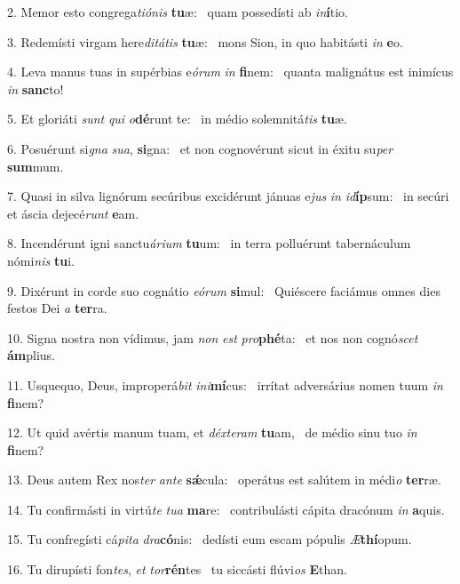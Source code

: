 2. Memor esto congrega\textit{ti}\textit{ó}\textit{nis} \textbf{tu}æ: \ast\  quam possedísti ab \textit{in}\textbf{í}tio.\

3. Redemísti virgam here\textit{di}\textit{tá}\textit{tis} \textbf{tu}æ: \ast\  mons Sion, in quo habitásti \textit{in} \textbf{e}o.\

4. Leva manus tuas in supérbias e\textit{ó}\textit{rum} \textit{in} \textbf{fi}nem: \ast\  quanta malignátus est inimícus \textit{in} \textbf{sanc}to!\

5. Et gloriáti \textit{sunt} \textit{qui} \textit{o}\textbf{dé}runt te: \ast\  in médio solemnitá\textit{tis} \textbf{tu}æ.\

6. Posuérunt si\textit{gna} \textit{su}\textit{a}, \textbf{si}gna: \ast\  et non cognovérunt sicut in éxitu su\textit{per} \textbf{sum}mum.\

7. Quasi in silva lignórum secúribus excidérunt jánuas e\textit{jus} \textit{in} \textit{id}\textbf{íp}sum: \ast\  in secúri et áscia dejecé\textit{runt} \textbf{e}am.\

8. Incendérunt igni sanctu\textit{á}\textit{ri}\textit{um} \textbf{tu}um: \ast\  in terra polluérunt tabernáculum nómi\textit{nis} \textbf{tu}i.\

9. Dixérunt in corde suo cognátio \textit{e}\textit{ó}\textit{rum} \textbf{si}mul: \ast\  Quiéscere faciámus omnes dies festos Dei \textit{a} \textbf{ter}ra.\

10. Signa nostra non vídimus, jam \textit{non} \textit{est} \textit{pro}\textbf{phé}ta: \ast\  et nos non cognó\textit{scet} \textbf{ám}plius.\

11. Usquequo, Deus, improperá\textit{bit} \textit{in}\textit{i}\textbf{mí}cus: \ast\  irrítat adversárius nomen tuum \textit{in} \textbf{fi}nem?\

12. Ut quid avértis manum tuam, et \textit{déx}\textit{te}\textit{ram} \textbf{tu}am, \ast\  de médio sinu tuo \textit{in} \textbf{fi}nem?\

13. Deus autem Rex nos\textit{ter} \textit{an}\textit{te} \textbf{sǽ}cula: \ast\  operátus est salútem in médi\textit{o} \textbf{ter}ræ.\

14. Tu confirmásti in virtú\textit{te} \textit{tu}\textit{a} \textbf{ma}re: \ast\  contribulásti cápita dracónum \textit{in} \textbf{a}quis.\

15. Tu confregísti cá\textit{pi}\textit{ta} \textit{dra}\textbf{có}nis: \ast\  dedísti eum escam pópulis \textit{Æ}\textbf{thí}opum.\

16. Tu dirupísti fon\textit{tes}, \textit{et} \textit{tor}\textbf{rén}tes \ast\  tu siccásti flúvi\textit{os} \textbf{E}than.\

